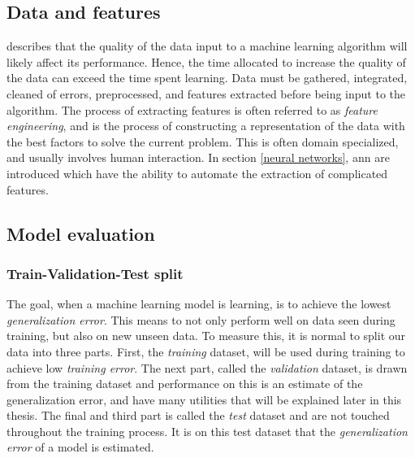     \subsection{Data and features}
    \citeauthor{najafabadi2015deep}\cite{najafabadi2015deep} describes that the quality of the data input to a machine learning algorithm will likely affect its performance. Hence, the time allocated to increase the quality of the data can exceed the time spent learning.  Data must be gathered, integrated, cleaned of errors, preprocessed, and features extracted before being input to the algorithm. The process of extracting features is often referred to as \textit{feature engineering}, and is the process of constructing a representation of the data with the best factors to solve the current problem. This is often domain specialized, and usually involves human interaction. In section \ref{neural networks}, \gls{ann} are introduced which have the ability to automate the extraction of complicated features.

    \subsection{Model evaluation}
    \subsubsection{Train-Validation-Test split}
        The goal, when a machine learning model is learning, is to achieve the lowest \textit{generalization error}\cite{Goodfellow-et-al-2016_generalization}. This means to not only perform well on data seen during training, but also on new unseen data. To measure this, it is normal to split our data into three parts\cite{Goodfellow-et-al-2016_train_val_test_split}. First, the \textit{training} dataset, will be used during training to achieve low  \textit{training error}. The next part, called the \textit{validation} dataset, is drawn from the training dataset and performance on this is an estimate of the generalization error, and have many utilities that will be explained later in this thesis. The final and third part is called the \textit{test} dataset and are not touched throughout the training process. It is on this test dataset that the \textit{generalization error} of a model is estimated.
    
